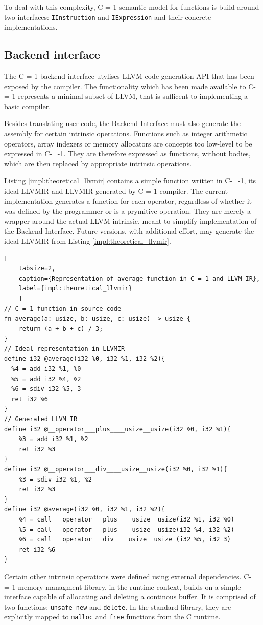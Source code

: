 To deal with this complexity, C-=-1 semantic model for functions is build around two interfaces: \lstinline{IInstruction} and \lstinline{IExpression} and their concrete implementations.

\subsection{Backend interface}
\label{implementation/backend-interface}

The C-=-1 backend interface utylises LLVM \cite{llvmir} code generation API that has been exposed by the compiler.
The functionality which has been made available to C-=-1 represents a minimal subset of LLVM, that is sufficent to implementing a basic compiler.

Besides translating user code, the Backend Interface must also generate the assembly for certain intrinsic operations.
Functions such as integer arithmetic operators, array indexers or memory allocators are concepts too low-level to be expressed in C-=-1.
They are therefore expressed as functions, without bodies, which are then replaced by appropriate intrinsic operations.

Listing \ref{impl:theoretical_llvmir} contains a simple function written in C-=-1, its ideal LLVMIR and LLVMIR generated by C-=-1 compiler.
The current implementation generates a function for each operator, regardless of whether it was defined by the programmer or is a prymitive operation.
They are merely a wrapper around the actual LLVM intrinsic, meant to simplify implementation of the Backend Interface.
Future versions, with additional effort, may generate the ideal LLVMIR from Listing \ref{impl:theoretical_llvmir}.

\begin{minipage}{\linewidth}
	\begin{lstlisting}[
	tabsize=2,
	caption={Representation of average function in C-=-1 and LLVM IR},
	label={impl:theoretical_llvmir}
	]
// C-=-1 function in source code
fn average(a: usize, b: usize, c: usize) -> usize {
	return (a + b + c) / 3;
}
// Ideal representation in LLVMIR
define i32 @average(i32 %0, i32 %1, i32 %2){
  %4 = add i32 %1, %0
  %5 = add i32 %4, %2
  %6 = sdiv i32 %5, 3
  ret i32 %6
}
// Generated LLVM IR
define i32 @__operator___plus____usize__usize(i32 %0, i32 %1){
	%3 = add i32 %1, %2
	ret i32 %3
}
define i32 @__operator___div____usize__usize(i32 %0, i32 %1){
	%3 = sdiv i32 %1, %2
	ret i32 %3
}
define i32 @average(i32 %0, i32 %1, i32 %2){
	%4 = call __operator___plus____usize__usize(i32 %1, i32 %0)
	%5 = call __operator___plus____usize__usize(i32 %4, i32 %2)
	%6 = call __operator___div____usize__usize (i32 %5, i32 3)
	ret i32 %6
}
\end{lstlisting}
\end{minipage}

Certain other intrinsic operations were defined using external dependencies.
C-=-1 memory managment library, in the runtime context, builds on a simple interface capable of allocating and deleting a continous buffer.
It is comprised of two functions: \lstinline{unsafe_new} and \lstinline{delete}.
In the standard library, they are explicitly mapped to \lstinline{malloc} and \lstinline{free} functions from the C runtime.

